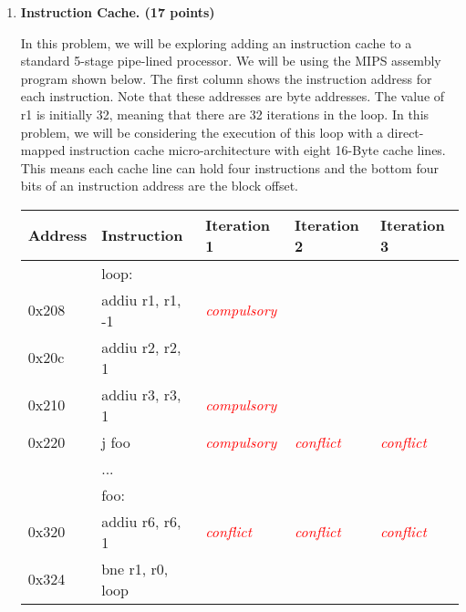 \documentclass[a4paper,10pt]{article}
\begin{document}
\begin{enumerate}

\item \textbf{Instruction Cache. (17 points)}

In this problem, we will be exploring adding an instruction cache to a standard 5-stage pipe-lined processor. We will be using the MIPS assembly program shown below. The first column shows the instruction address for each instruction. Note that these addresses are byte addresses. The value of r1 is initially 32, meaning that there are 32 iterations in the loop. In this problem, we will be considering the execution of this loop with a direct-mapped instruction cache micro-architecture with eight 16-Byte cache lines. This means each cache line can hold four instructions and the bottom four bits of an instruction address are the block offset.

\begin{center}
\begin{tabular}{lllll}
\toprule  
\textbf{Address} & \textbf{Instruction} & \textbf{Iteration 1} & \textbf{Iteration 2} & \textbf{Iteration 3} \\
\midrule
&loop:&&&\\
\midrule
0x208& addiu r1, r1, -1&\textcolor{red}{\textit{compulsory}}&&\\
\midrule
0x20c& addiu r2, r2, 1&&&\\
\midrule
0x210& addiu r3, r3, 1&\textcolor{red}{\textit{compulsory}}&&\\
\midrule
0x220& j foo&\textcolor{red}{\textit{compulsory}}&\textcolor{red}{\textit{conflict}}&\textcolor{red}{\textit{conflict}}\\
\midrule
&...&&&\\
\midrule
&foo:&&&\\
\midrule
0x320& addiu r6, r6, 1&\textcolor{red}{\textit{conflict}}&\textcolor{red}{\textit{conflict}}&\textcolor{red}{\textit{conflict}}\\
\midrule
0x324& bne r1, r0, loop&&&\\
\bottomrule
\end{tabular}
\end{center}



\end{enumerate}
\end{document}
